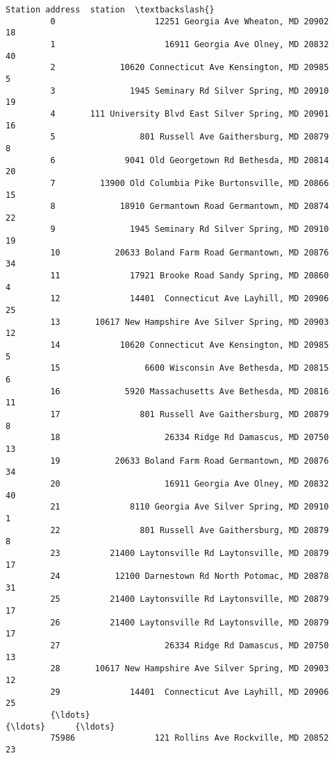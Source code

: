 \documentclass[11pt]{article}
\begin{document}
\begin{Verbatim}[commandchars=\\\{\}]
                                                  Station address  station  \textbackslash{}
         0                    12251 Georgia Ave Wheaton, MD 20902       18   
         1                      16911 Georgia Ave Olney, MD 20832       40   
         2             10620 Connecticut Ave Kensington, MD 20985        5   
         3               1945 Seminary Rd Silver Spring, MD 20910       19   
         4       111 University Blvd East Silver Spring, MD 20901       16   
         5                 801 Russell Ave Gaithersburg, MD 20879        8   
         6              9041 Old Georgetown Rd Bethesda, MD 20814       20   
         7         13900 Old Columbia Pike Burtonsville, MD 20866       15   
         8             18910 Germantown Road Germantown, MD 20874       22   
         9               1945 Seminary Rd Silver Spring, MD 20910       19   
         10           20633 Boland Farm Road Germantown, MD 20876       34   
         11              17921 Brooke Road Sandy Spring, MD 20860        4   
         12              14401  Connecticut Ave Layhill, MD 20906       25   
         13       10617 New Hampshire Ave Silver Spring, MD 20903       12   
         14            10620 Connecticut Ave Kensington, MD 20985        5   
         15                 6600 Wisconsin Ave Bethesda, MD 20815        6   
         16             5920 Massachusetts Ave Bethesda, MD 20816       11   
         17                801 Russell Ave Gaithersburg, MD 20879        8   
         18                     26334 Ridge Rd Damascus, MD 20750       13   
         19           20633 Boland Farm Road Germantown, MD 20876       34   
         20                     16911 Georgia Ave Olney, MD 20832       40   
         21              8110 Georgia Ave Silver Spring, MD 20910        1   
         22                801 Russell Ave Gaithersburg, MD 20879        8   
         23          21400 Laytonsville Rd Laytonsville, MD 20879       17   
         24           12100 Darnestown Rd North Potomac, MD 20878       31   
         25          21400 Laytonsville Rd Laytonsville, MD 20879       17   
         26          21400 Laytonsville Rd Laytonsville, MD 20879       17   
         27                     26334 Ridge Rd Damascus, MD 20750       13   
         28       10617 New Hampshire Ave Silver Spring, MD 20903       12   
         29              14401  Connecticut Ave Layhill, MD 20906       25   
         {\ldots}                                                  {\ldots}      {\ldots}   
         75986                121 Rollins Ave Rockville, MD 20852       23   

\end{Verbatim}
\end{document}
